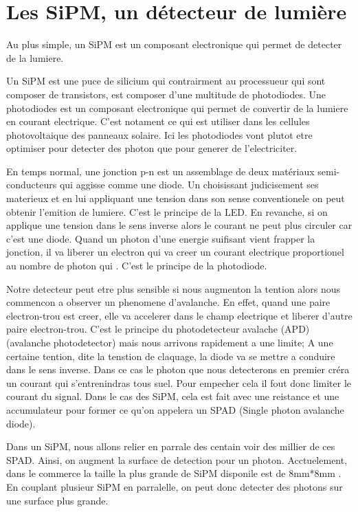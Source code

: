 \section{Les SiPM, un détecteur de lumière}
Au plus simple, un SiPM est un composant electronique qui permet de detecter de la lumiere.

Un SiPM est une puce de silicium qui contrairment au processueur qui sont composer de transistors, est composer d'une multitude de photodiodes. Une photodiodes est un composant electronique qui permet de convertir de la lumiere en courant electrique. C'est notament ce qui est utiliser dans les cellules photovoltaique des panneaux solaire. Ici les photodiodes vont plutot etre optimiser pour detecter des photon que pour generer de l'electriciter. 

En temps normal, une jonction p-n est un assemblage de deux matériaux semi-conducteurs qui aggisse comme une diode. Un choisissant judicisement ses materieux et en lui appliquant une tension dans son sense conventionele on peut obtenir l'emition de lumiere. C'est le principe de la LED. En revanche, si on applique une tension dans le sens inverse alors le courant ne peut plus circuler car c'est une diode. Quand un photon d'une energie suifisant vient frapper la jonction, il va liberer un electron qui va creer un courant electrique proportionel au nombre de photon qui . C'est le principe de la photodiode.

Notre detecteur peut etre plus sensible si nous augmenton la tention alors nous commencon a observer un phenomene d'avalanche. En effet, quand une paire electron-trou est creer, elle va accelerer dans le champ electrique et liberer d'autre paire electron-trou. C'est le principe du photodetecteur avalache (APD)
(avalanche photodetector) mais nous arrivons rapidement a une limite; A une certaine tention, dite la tenstion de claquage, la diode va se mettre a conduire dans le sens inverse. Dans ce cas le photon que nous detecterons en premier créra un courant qui s'entrenindras tous suel. Pour empecher cela il fout donc limiter le courant du signal. Dans le cas des SiPM, cela est fait avec une reistance et une accumulateur pour former ce qu'on appelera un SPAD (Single photon avalanche diode).

Dans un SiPM, nous allons relier en parrale des centain voir des millier de ces SPAD. Ainsi, on augment la surface de detection pour un photon. Acctuelement, dans le commerce la taille la plus grande de SiPM disponile est de 8mm*8mm \cite{}. En couplant plusieur SiPM en parralelle, on peut donc detecter des photons sur une surface plus grande.
